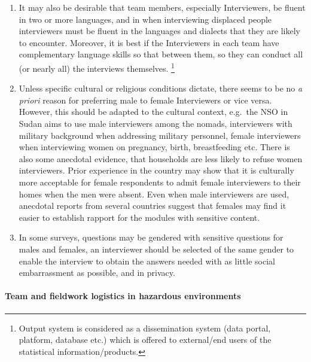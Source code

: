 \documentclass[
]{article}
\begin{document}
\begin{enumerate}
\def\labelenumi{\arabic{enumi}.}
\setcounter{enumi}{345}
\item
  It may also be desirable that team members, especially
  Interviewers, be fluent in two or more languages, and in when
  interviewing displaced people interviewers must be fluent in the
  languages and dialects that they are likely to encounter. Moreover,
  it is best if the Interviewers in each team have complementary
  language skills so that between them, so they can conduct all (or
  nearly all) the interviews themselves. \footnote{Output system is considered as a dissemination system (data
    portal, platform, database etc.) which is offered to external/end
    users of the statistical information/products.}
\item
  Unless specific cultural or religious conditions dictate, there
  seems to be no \emph{a priori} reason for preferring male to female
  Interviewers or vice versa. However, this should be adapted to the
  cultural context, e.g.~the NSO in Sudan aims to use male
  interviewers among the nomads, interviewers with military background
  when addressing military personnel, female interviewers when
  interviewing women on pregnancy, birth, breastfeeding etc. There is
  also some anecdotal evidence, that households are less likely to
  refuse women interviewers. Prior experience in the country may show
  that it is culturally more acceptable for female respondents to
  admit female interviewers to their homes when the men were absent.
  Even when male interviewers are used, anecdotal reports from several
  countries suggest that females may find it easier to establish
  rapport for the modules with sensitive content.
\item
  In some surveys, questions may be gendered with sensitive questions
  for males and females, an interviewer should be selected of the same
  gender to enable the interview to obtain the answers needed with as
  little social embarrassment as possible, and in privacy.
\end{enumerate}

\hypertarget{team-and-fieldwork-logistics-in-hazardous-environments}{%
\paragraph{Team and fieldwork logistics in hazardous environments}\label{team-and-fieldwork-logistics-in-hazardous-environments}}
\end{document}
